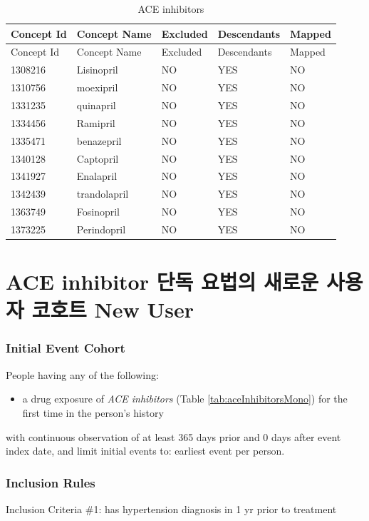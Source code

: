 \documentclass[10.5pt]{book}
\providecommand{\tightlist}{%
  \setlength{\itemsep}{0pt}\setlength{\parskip}{0pt}}
\theoremstyle{definition}
\theoremstyle{definition}
\theoremstyle{definition}
\theoremstyle{remark}
\begin{document}
\begin{longtable}[]{@{}lllll@{}}
\caption{\label{tab:aceInhibitors} ACE inhibitors}\tabularnewline
\toprule
Concept Id & Concept Name & Excluded & Descendants &
Mapped\tabularnewline
\midrule
\endfirsthead
\toprule
Concept Id & Concept Name & Excluded & Descendants &
Mapped\tabularnewline
\midrule
\endhead
1308216 & Lisinopril & NO & YES & NO\tabularnewline
1310756 & moexipril & NO & YES & NO\tabularnewline
1331235 & quinapril & NO & YES & NO\tabularnewline
1334456 & Ramipril & NO & YES & NO\tabularnewline
1335471 & benazepril & NO & YES & NO\tabularnewline
1340128 & Captopril & NO & YES & NO\tabularnewline
1341927 & Enalapril & NO & YES & NO\tabularnewline
1342439 & trandolapril & NO & YES & NO\tabularnewline
1363749 & Fosinopril & NO & YES & NO\tabularnewline
1373225 & Perindopril & NO & YES & NO\tabularnewline
\bottomrule
\end{longtable}

\section{ACE inhibitor 단독 요법의 새로운 사용자 코호트 New
User}\label{AceInhibitorsMono}

\subsubsection*{Initial Event Cohort}\label{initial-event-cohort-1}

People having any of the following:

\begin{itemize}
\tightlist
\item
  a drug exposure of \emph{ACE inhibitors} (Table
  \ref{tab:aceInhibitorsMono}) for the first time in the person's
  history
\end{itemize}

with continuous observation of at least 365 days prior and 0 days after
event index date, and limit initial events to: earliest event per
person.

\subsubsection*{Inclusion Rules}\label{inclusion-rules}

Inclusion Criteria \#1: has hypertension diagnosis in 1 yr prior to
treatment
\end{document}
